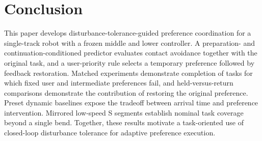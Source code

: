 \documentclass[journal]{IEEEtran}
\begin{document}
\section{Conclusion}

This paper develops disturbance-tolerance-guided preference coordination for a single-track robot with a frozen middle and lower controller. A preparation- and continuation-conditioned predictor evaluates contact avoidance together with the original task, and a user-priority rule selects a temporary preference followed by feedback restoration. Matched experiments demonstrate completion of tasks for which fixed user and intermediate preferences fail, and held-versus-return comparisons demonstrate the contribution of restoring the original preference. Preset dynamic baselines expose the tradeoff between arrival time and preference intervention. Mirrored low-speed S segments establish nominal task coverage beyond a single bend. Together, these results motivate a task-oriented use of closed-loop disturbance tolerance for adaptive preference execution.
\end{document}
